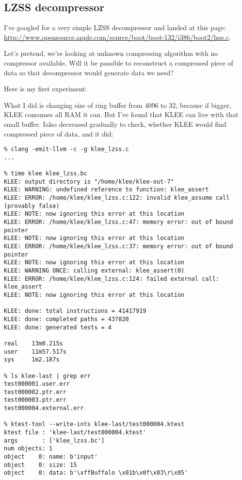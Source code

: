 \subsection{LZSS decompressor}

I've googled for a very simple \ac{LZSS} decompressor and landed at this page:
\url{http://www.opensource.apple.com/source/boot/boot-132/i386/boot2/lzss.c}.

Let's pretend, we're looking at unknown compressing algorithm with no compressor available.
Will it be possible to reconstruct a compressed piece of data so that decompressor would generate data we need?

Here is my first experiment:



What I did is changing size of ring buffer from 4096 to 32, because if bigger, KLEE consumes all \ac{RAM} it can.
But I've found that KLEE can live with that small buffer.
I\ve also decreased  gradually to check, whether KLEE would find compressed piece of data, and it did:

\begin{lstlisting}
% clang -emit-llvm -c -g klee_lzss.c
...

% time klee klee_lzss.bc
KLEE: output directory is "/home/klee/klee-out-7"
KLEE: WARNING: undefined reference to function: klee_assert
KLEE: ERROR: /home/klee/klee_lzss.c:122: invalid klee_assume call (provably false)
KLEE: NOTE: now ignoring this error at this location
KLEE: ERROR: /home/klee/klee_lzss.c:47: memory error: out of bound pointer
KLEE: NOTE: now ignoring this error at this location
KLEE: ERROR: /home/klee/klee_lzss.c:37: memory error: out of bound pointer
KLEE: NOTE: now ignoring this error at this location
KLEE: WARNING ONCE: calling external: klee_assert(0)
KLEE: ERROR: /home/klee/klee_lzss.c:124: failed external call: klee_assert
KLEE: NOTE: now ignoring this error at this location

KLEE: done: total instructions = 41417919
KLEE: done: completed paths = 437820
KLEE: done: generated tests = 4

real    13m0.215s
user    11m57.517s
sys     1m2.187s

% ls klee-last | grep err
test000001.user.err
test000002.ptr.err
test000003.ptr.err
test000004.external.err

% ktest-tool --write-ints klee-last/test000004.ktest
ktest file : 'klee-last/test000004.ktest'
args       : ['klee_lzss.bc']
num objects: 1
object    0: name: b'input'
object    0: size: 15
object    0: data: b'\xffBuffalo \x01b\x0f\x03\r\x05'
\end{lstlisting}


